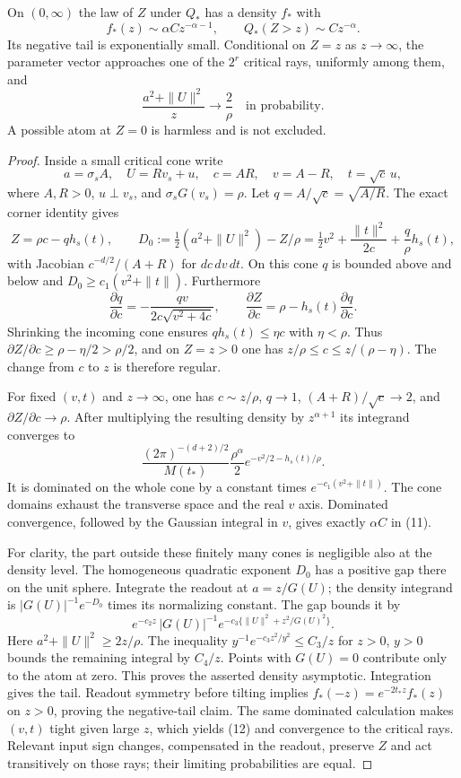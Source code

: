 \begin{lemma}\label{lem:localtail}
On $(0,\infty)$ the law of $Z$ under $Q_*$ has a density $f_*$ with
\[
 f_*(z)\sim\alpha C z^{-\alpha-1},\qquad
 Q_*(Z>z)\sim C z^{-\alpha}.
 \tag{11}
\]
Its negative tail is exponentially small. Conditional on $Z=z$ as
$z\to\infty$, the parameter vector approaches one of the $2^r$
critical rays, uniformly among them, and
\[
          \frac{a^2+\|U\|^2}{z}\longrightarrow\frac2\rho
 \quad\text{in probability}.                          \tag{12}
\]
A possible atom at $Z=0$ is harmless and is not excluded.
\end{lemma}
\begin{proof}
Inside a small critical cone write
\[
 a=\sigma_s A,\quad U=Rv_s+u,\quad c=AR,\quad v=A-R,
 \quad t=\sqrt c\,u,
\]
where $A,R>0$, $u\perp v_s$, and $\sigma_sG(v_s)=\rho$.
Let $q=A/\sqrt c=\sqrt{A/R}$. The exact corner identity gives
\[
 Z=\rho c-qh_s(t),\qquad
 D_0:=\tfrac12(a^2+\|U\|^2)-Z/\rho
       =\tfrac12v^2+\frac{\|t\|^2}{2c}+\frac q\rho h_s(t),
\]
with Jacobian $c^{-d/2}/(A+R)$ for $dc\,dv\,dt$.
On this cone $q$ is bounded above and below and
$D_0\ge c_1(v^2+\|t\|)$.
Furthermore
\[
 \frac{\partial q}{\partial c}
       =-\frac{qv}{2c\sqrt{v^2+4c}},\qquad
 \frac{\partial Z}{\partial c}=\rho-h_s(t)\frac{\partial q}{\partial c}.
\]
Shrinking the incoming cone ensures $qh_s(t)\le\eta c$ with
$\eta<\rho$. Thus $\partial Z/\partial c\ge\rho-\eta/2>\rho/2$,
and on $Z=z>0$ one has $z/\rho\le c\le z/(\rho-\eta)$.
The change from $c$ to $z$ is therefore regular.

For fixed $(v,t)$ and $z\to\infty$, one has
$c\sim z/\rho$, $q\to1$, $(A+R)/\sqrt c\to2$, and
$\partial Z/\partial c\to\rho$. After multiplying the resulting
density by $z^{\alpha+1}$ its integrand converges to
\[
 \frac{(2\pi)^{-(d+2)/2}}{M(t_*)}
       \frac{\rho^\alpha}{2}
                      e^{-v^2/2-h_s(t)/\rho}.
\]
It is dominated on the whole cone by a constant times
$e^{-c_1(v^2+\|t\|)}$. The cone domains exhaust the transverse
space and the real $v$ axis. Dominated convergence, followed by the
Gaussian integral in $v$, gives exactly $\alpha C$ in (11).

For clarity, the part outside these finitely many cones is negligible
also at the density level. The homogeneous quadratic exponent $D_0$
has a positive gap there on the unit sphere. Integrate the readout at
$a=z/G(U)$; the density integrand is $|G(U)|^{-1}e^{-D_0}$ times
its normalizing constant. The gap bounds it by
\[
 e^{-c_2z}\,|G(U)|^{-1}
           e^{-c_3\{\|U\|^2+z^2/G(U)^2\}}.
\]
Here $a^2+\|U\|^2\ge2z/\rho$. The inequality
$y^{-1}e^{-c_3z^2/y^2}\le C_3/z$ for $z>0$, $y>0$ bounds the
remaining integral by $C_4/z$. Points with $G(U)=0$ contribute only
to the atom at zero. This proves the asserted density asymptotic.
Integration gives the tail. Readout symmetry before tilting implies
$f_*(-z)=e^{-2t_*z}f_*(z)$ on $z>0$, proving the negative-tail claim.
The same dominated calculation makes $(v,t)$ tight given large $z$,
which yields (12) and convergence to the critical rays. Relevant input
sign changes, compensated in the readout, preserve $Z$ and act
transitively on those rays; their limiting probabilities are equal.
\end{proof}

